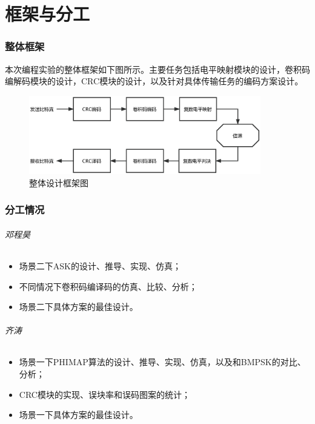 \part{框架与分工}

\section{整体框架}

本次编程实验的整体框架如下图所示。主要任务包括电平映射模块的设计，卷积码编解码模块的设计，CRC模块的设计，以及针对具体传输任务的编码方案设计。

\begin{figure}[h]
    \centering
    \includegraphics[width=0.9\textwidth,trim=0 40 0 40,clip]{pic/framework.eps}
    \caption{整体设计框架图}
\end{figure}

\section{分工情况}

\paragraph{邓程昊}
\indent

\begin{itemize}
    \item 场景二下ASK的设计、推导、实现、仿真；
    \item 不同情况下卷积码编译码的仿真、比较、分析；
    \item 场景二下具体方案的最佳设计。
\end{itemize}

\paragraph{齐涛}
\indent

\begin{itemize}
    \item 场景一下PHIMAP算法的设计、推导、实现、仿真，以及和BMPSK的对比、分析；
    \item CRC模块的实现、误块率和误码图案的统计；
    \item 场景一下具体方案的最佳设计。
\end{itemize}

